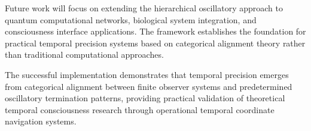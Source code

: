 \documentclass[12pt,a4paper]{article}
\begin{document}
Future work will focus on extending the hierarchical oscillatory approach to quantum computational networks, biological system integration, and consciousness interface applications. The framework establishes the foundation for practical temporal precision systems based on categorical alignment theory rather than traditional computational approaches.

The successful implementation demonstrates that temporal precision emerges from categorical alignment between finite observer systems and predetermined oscillatory termination patterns, providing practical validation of theoretical temporal consciousness research through operational temporal coordinate navigation systems.
\end{document}
